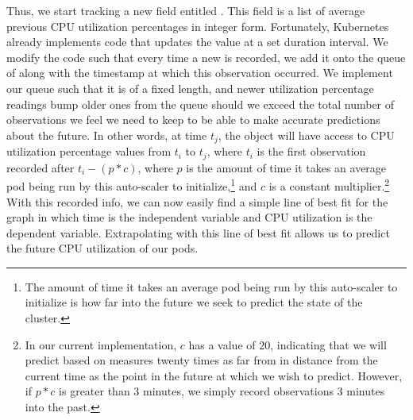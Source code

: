 Thus, we start tracking a new field entitled
. This field is a list of average previous CPU
utilization percentages in integer form. Fortunately, Kubernetes already
implements code that updates the  value
at a set duration interval. We modify the code such that every time a new
 is recorded, we add it onto the queue of
 along with the timestamp at which
this observation occurred. We implement our queue such that it
is of a fixed length, and newer utilization percentage readings bump older ones
from the queue should we exceed the total number of observations we feel we need
to keep to be able to make accurate predictions about the future. In other words, at time
$t_{j}$, the  object will have access to
CPU utilization percentage values from $t_{i}$ to $t_{j}$, where $t_{i}$ is the
first observation recorded after $t_{i} - (p * c)$, where $p$ is the
amount of time it takes an
average pod being run by this auto-scaler to initialize,\footnote{The
amount of time it takes an
average pod being run by this auto-scaler to initialize is how far into the
future we seek to predict the state of the cluster.} and $c$ is a constant
multiplier.\footnote{In our current implementation, $c$ has a value of
$20$, indicating that we will predict based on measures twenty times as far from
in distance from the current time as the point in
the future at which we wish to predict. However, if $p * c$ is greater than 3
minutes, we simply record observations 3 minutes into the past.} With this recorded info,
we can now easily find a simple line of best fit
for the graph in which time is the independent variable and CPU utilization is
the dependent variable. Extrapolating with this line of best fit allows us to
predict the future CPU utilization of our pods.
